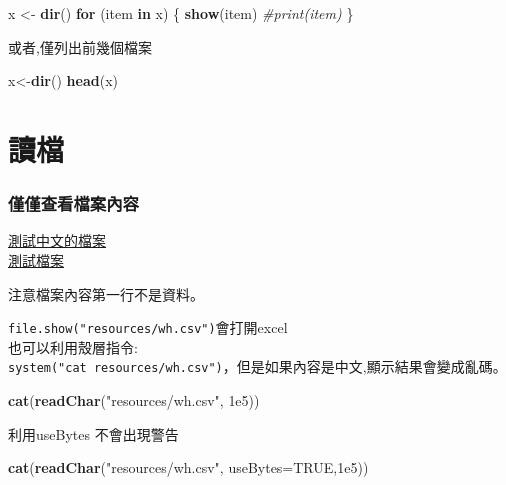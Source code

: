 \documentclass[]{book}
\newenvironment{Shaded}{\begin{snugshade}}{\end{snugshade}}
\newcommand{\KeywordTok}[1]{\textcolor[rgb]{0.13,0.29,0.53}{\textbf{#1}}}
\newcommand{\DataTypeTok}[1]{\textcolor[rgb]{0.13,0.29,0.53}{#1}}
\newcommand{\FloatTok}[1]{\textcolor[rgb]{0.00,0.00,0.81}{#1}}
\newcommand{\StringTok}[1]{\textcolor[rgb]{0.31,0.60,0.02}{#1}}
\newcommand{\CommentTok}[1]{\textcolor[rgb]{0.56,0.35,0.01}{\textit{#1}}}
\newcommand{\OtherTok}[1]{\textcolor[rgb]{0.56,0.35,0.01}{#1}}
\newcommand{\ControlFlowTok}[1]{\textcolor[rgb]{0.13,0.29,0.53}{\textbf{#1}}}
\newcommand{\NormalTok}[1]{#1}
\theoremstyle{definition}
\theoremstyle{definition}
\theoremstyle{definition}
\theoremstyle{remark}
\begin{document}
\begin{Shaded}
\begin{Highlighting}[]
\NormalTok{x <-}\StringTok{ }\KeywordTok{dir}\NormalTok{()}
\ControlFlowTok{for}\NormalTok{ (item }\ControlFlowTok{in}\NormalTok{ x) \{}
    \KeywordTok{show}\NormalTok{(item) }\CommentTok{#print(item)}
\NormalTok{\}}
\end{Highlighting}
\end{Shaded}

或者,僅列出前幾個檔案

\begin{Shaded}
\begin{Highlighting}[]
\NormalTok{x<-}\KeywordTok{dir}\NormalTok{()}
\KeywordTok{head}\NormalTok{(x)}
\end{Highlighting}
\end{Shaded}

\section{讀檔}

\subsubsection{僅僅查看檔案內容}

\href{resources/wh_chinese.csv}{測試中文的檔案}\\
\href{resources/wh.csv}{測試檔案}

注意檔案內容第一行不是資料。

\texttt{file.show("resources/wh.csv")}會打開excel\\
也可以利用殼層指令:\\
\texttt{system("cat\ resources/wh.csv")}，但是如果內容是中文,顯示結果會變成亂碼。

\begin{Shaded}
\begin{Highlighting}[]
\KeywordTok{cat}\NormalTok{(}\KeywordTok{readChar}\NormalTok{(}\StringTok{"resources/wh.csv"}\NormalTok{, }\FloatTok{1e5}\NormalTok{))}
\end{Highlighting}
\end{Shaded}

利用useBytes 不會出現警告

\begin{Shaded}
\begin{Highlighting}[]
\KeywordTok{cat}\NormalTok{(}\KeywordTok{readChar}\NormalTok{(}\StringTok{"resources/wh.csv"}\NormalTok{, }\DataTypeTok{useBytes=}\OtherTok{TRUE}\NormalTok{,}\FloatTok{1e5}\NormalTok{))  }
\end{Highlighting}
\end{Shaded}
\end{document}
